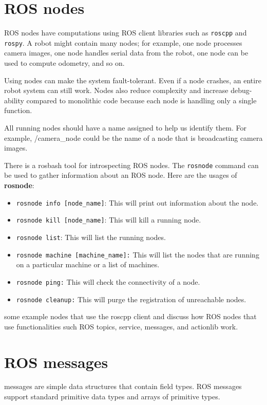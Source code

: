 \documentclass[../../main]{subfiles}
\begin{document}
\section{ROS nodes}
ROS nodes have computations using ROS client libraries such as \texttt{roscpp} and \texttt{rospy}. A robot might contain many nodes; for example, one node processes camera images, one node handles serial data from the robot, one node can be used to compute odometry, and so on.

Using nodes can make the system fault-tolerant. Even if a node crashes, an entire robot system can still work. Nodes also reduce complexity and increase debug-ability compared to monolithic code because each node is handling only a single function.

All running nodes should have a name assigned to help us identify them. For example, /camera\_node could be the name of a node that is broadcasting camera images.

There is a rosbash tool for introspecting ROS nodes. The \texttt{rosnode} command can be used to gather information about an ROS node. Here are the usages of \textbf{rosnode}:
\newpage
\begin{itemize}
    \item \texttt{rosnode info [node\_name]}: This will print out information about the node.
    \item \texttt{rosnode kill [node\_name]}: This will kill a running node.
    \item \texttt{rosnode list}: This will list the running nodes.
    \item  \texttt{rosnode machine [machine\_name]:} This will list the nodes that are running
    on a particular machine or a list of machines.
    \item  \texttt{rosnode ping:} This will check the connectivity of a node.
    \item  \texttt{rosnode cleanup:} This will purge the registration of unreachable nodes.
\end{itemize}
some example nodes that use the roscpp client and discuss how
ROS nodes that use functionalities such ROS topics, service, messages, and actionlib
work.
\section{ROS messages}
messages are simple data structures that contain field types. ROS messages support standard primitive data types and arrays of primitive types.
\end{document}
